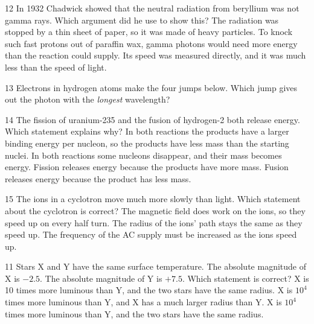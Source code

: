 \begin{practiceq}{1}{2}\label{pq:chadwick}
In 1932 Chadwick showed that the neutral radiation from beryllium was not gamma rays. Which
argument did he use to show this?
  {The radiation was stopped by a thin sheet of paper, so it was made of heavy particles.}
  {To knock such fast protons out of paraffin wax, gamma photons would need more energy than
   the reaction could supply.}
  {Its speed was measured directly, and it was much less than the speed of light.}
\end{practiceq}

\begin{practiceq}{1}{3}\label{pq:longest}
Electrons in hydrogen atoms make the four jumps below. Which jump gives out the photon with
the \emph{longest} wavelength?
\end{practiceq}

\begin{practiceq}{1}{4}\label{pq:becurve}
The fission of uranium-235 and the fusion of hydrogen-2 both release energy. Which statement
explains why?
  {In both reactions the products have a larger binding energy per nucleon, so the products
   have less mass than the starting nuclei.}
  {In both reactions some nucleons disappear, and their mass becomes energy.}
  {Fission releases energy because the products have more mass. Fusion releases energy
   because the product has less mass.}
\end{practiceq}

\begin{practiceq}{1}{5}\label{pq:cyclotronmc}
The ions in a cyclotron move much more slowly than light. Which statement about the
cyclotron is correct?
  {The magnetic field does work on the ions, so they speed up on every half turn.}
  {The radius of the ions' path stays the same as they speed up.}
  {The frequency of the AC supply must be increased as the ions speed up.}
\end{practiceq}

\begin{practiceq}{1}{1}\label{pq:magnitude}
Stars X and Y have the same surface temperature. The absolute magnitude of X is $-2.5$. The
absolute magnitude of Y is $+7.5$. Which statement is correct?
  {X is 10 times more luminous than Y, and the two stars have the same radius.}
  {X is $10^4$ times more luminous than Y, and X has a much larger radius than Y.}
  {X is $10^4$ times more luminous than Y, and the two stars have the same radius.}
\end{practiceq}

